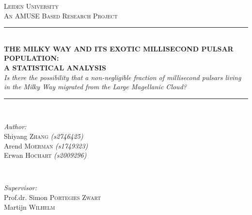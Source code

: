 \begin{titlepage}

\newcommand{\HRule}{\rule{\linewidth}{0.7mm}} %

\center %
 

\textsc{\LARGE Leiden University}\\[1cm] %
\textsc{\Large An AMUSE Based Research Project}\\[0.5cm] %


\HRule \\[0.5cm]
{ \LARGE \textbf{\uppercase{ The Milky Way and its exotic Millisecond Pulsar Population: \\ A Statistical Analysis}}\\[0.29cm]
\small \textit{Is there the possibility that a non-negligible fraction of millisecond pulsars living in the Milky Way migrated from the Large Magellanic Cloud?}}\\[0.29cm] %
\HRule \\[1cm]
 

\begin{minipage}{0.4\textwidth}
\begin{flushleft} \large
\emph{Author:}\\
Shiyang \textsc{ Zhang} \textit{(s2746425)}\\ Arend \textsc{ Moerman} \textit{(s1749323)}\\ Erwan\textsc{ Hochart} \textit{(s2009296)} \\
\end{flushleft}
\end{minipage}
~
\begin{minipage}{0.5\textwidth}
\begin{flushright} \large
\emph{Supervisor:} \\
Prof.dr. Simon \textsc{Portegies Zwart} \\
Martijn \textsc{Wilhelm}\\
\end{flushright}
\end{minipage}\\[1cm]


\end{titlepage}

